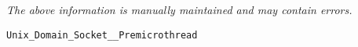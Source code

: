 \label{pkg:unix\_domain\_socket\_\_premicrothread}

{\tiny \it The above information is manually maintained and may contain errors.}
\begin{verbatim}
Unix_Domain_Socket__Premicrothread
\end{verbatim}
